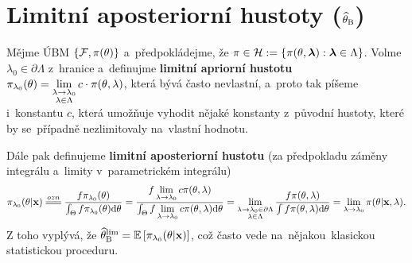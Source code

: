 \section{Limitní aposteriorní hustoty ($\widehat{\theta}_\mathrm{B}$)}
\begin{define}
	Mějme ÚBM $\{\mathcal{F},\pi(\theta)\}$ a~předpokládejme, že $\pi\in\mathcal{H}:=\{\pi(\theta,\boldsymbol{\lambda}):\boldsymbol{\lambda}\in\Lambda\}$. Volme $\lambda_0\in\partial\Lambda$ z~hranice a~definujme \textbf{limitní apriorní hustotu} $\pi_{\lambda_0}(\theta)=\lim\limits_{\substack{
		\lambda\to\lambda_0\\\lambda\in\Lambda	}
}c\cdot \pi(\theta,\lambda)$, která bývá často nevlastní, a~proto tak píšeme i~konstantu $c$, která umožňuje vyhodit nějaké konstanty z~původní hustoty, které by se~případně nezlimitovaly na~vlastní hodnotu. 
\end{define}

\begin{define}
	Dále pak definujeme \textbf{limitní aposteriorní hustotu} (za předpokladu záměny integrálu a~limity v~parametrickém integrálu) $$\pi_{\lambda_0}(\t|\textbf{x})\equal{ozn}\frac{f\pi_{\lambda_0}(\t)}{\int_\Theta f\pi_{\lambda_0}(\t)\d\t}=\frac{f\lim\limits_{\lambda\to\lambda_0}c\pi(\t,\lambda)}{\int_\Theta f\lim\limits_{\lambda\to\lambda_0}c\pi(\t,\lambda) \d\t}=\lim\limits_{\substack{
		\lambda\to\lambda_0\in\partial\Lambda\\\lambda\in\Lambda	}
}\frac{f\pi(\t,\lambda)}{\int f\pi(\t,\lambda)\d\t}=\lim\limits_{\lambda\to\lambda_0}\pi(\t|\textbf{x},\lambda).$$
Z toho vyplývá, že $\widehat{\theta}_{\mathrm{{\footnotesize B }}}^\mathrm{lim} =\mathbb{E}\left[ \pi_{\lambda_0}(\theta|\textbf{x}) \right]$, což často vede na~nějakou~klasickou statistickou proceduru.
\end{define}

